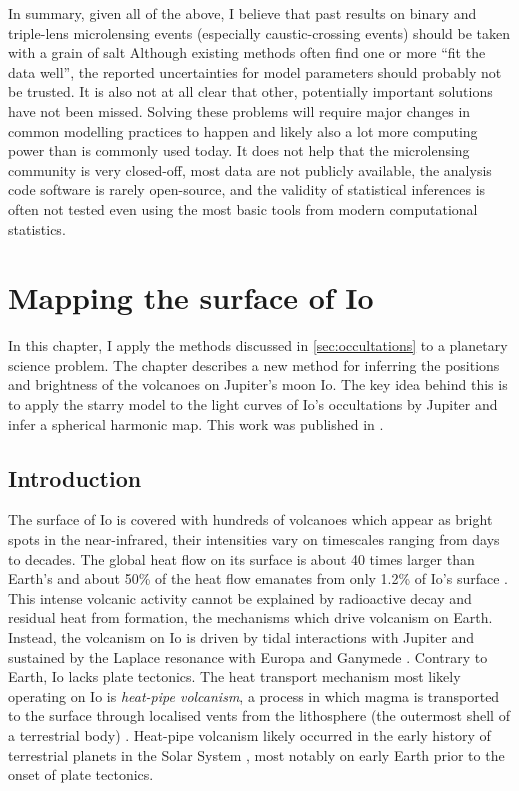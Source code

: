 \documentclass[12pt,dvipsnames]{report}
\newcommand{\ssf}[1]{\textsf{#1}}
\begin{document}
In summary, given all of the above, I believe that past results on binary and triple-lens 
microlensing events (especially caustic-crossing events) should be taken with a grain of salt
Although existing methods often find one or more
``fit the data well'', the reported uncertainties for 
model parameters should probably not be trusted. 
It is also not at all clear that other, 
potentially important solutions have not been missed. Solving these problems will require 
major changes in common modelling practices to happen and likely also a lot more computing power than 
is commonly used today. It does
not help that the microlensing community is very closed-off, most data are not 
publicly available, the analysis code software is rarely open-source, and the validity of 
statistical inferences is often not tested even using the most basic tools from modern 
computational statistics.

\chapter{Mapping the surface of Io}
\label{ch:io}
In this chapter, I apply the methods discussed in \ref{sec:occultations} to a planetary 
science problem. The chapter describes a new method for inferring the positions and 
brightness of the volcanoes on Jupiter's moon Io. The key idea behind this is to apply the 
\ssf{starry} model to the light curves of Io's occultations by Jupiter and 
infer a spherical harmonic map. This work was published in \citet{2022PSJ.....3...67B}.

\section{Introduction}
The surface of Io is covered with hundreds of volcanoes which appear as bright spots in 
the near-infrared, their intensities vary on timescales ranging from days to decades.
The global heat flow on its surface is about 40 times larger than Earth's 
\citep{2007plmo.book..299B,2010SolE....1....5D} and about 50\% of the heat flow 
emanates from only 1.2\% 
of Io's surface \citep{2012Icar..219..701V}.
This intense volcanic activity cannot be explained by radioactive decay and residual 
heat from formation, the mechanisms which  drive volcanism on Earth.
Instead, the volcanism on Io is driven by tidal interactions with Jupiter and sustained 
by the Laplace resonance with Europa and Ganymede \citep{1979Sci...203..892P}.
Contrary to Earth, Io lacks plate tectonics.
The heat transport mechanism most likely operating on Io is \emph{heat-pipe volcanism}, 
a process in which magma is transported to the surface through localised vents from 
the lithosphere  (the outermost shell of a terrestrial body) \citep{1981GeoRL...8..313O}.
Heat-pipe volcanism likely occurred in the early history of terrestrial planets in the 
Solar System \citep{1981GeoRL...8..313O,2007plmo.book..299B}, most notably on early Earth 
prior to the onset of plate tectonics.
\end{document}
